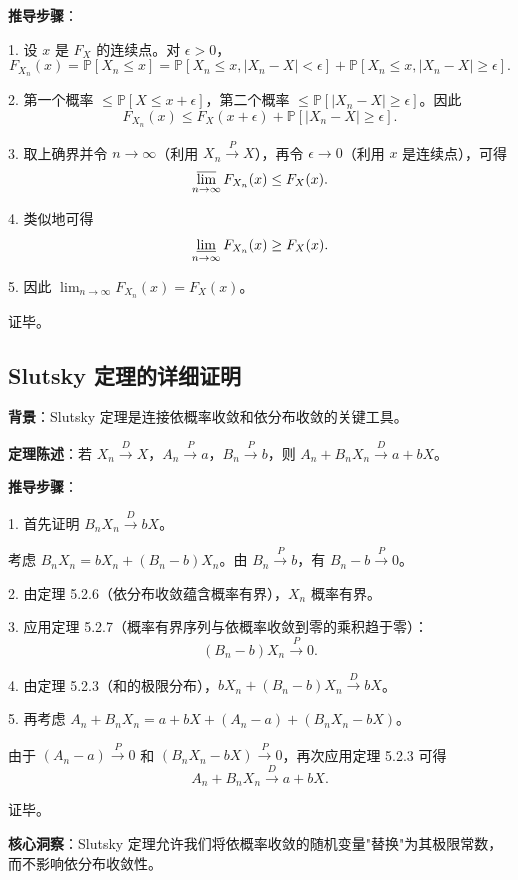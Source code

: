 \textbf{推导步骤}：

1. 设 $x$ 是 $F_X$ 的连续点。对 $\epsilon > 0$，
\[
F_{X_n}(x) = \mathbb{P}[X_n \leq x] = \mathbb{P}[X_n \leq x, |X_n - X| < \epsilon] + \mathbb{P}[X_n \leq x, |X_n - X| \geq \epsilon].
\]

2. 第一个概率 $\leq \mathbb{P}[X \leq x + \epsilon]$，第二个概率 $\leq \mathbb{P}[|X_n - X| \geq \epsilon]$。因此
\[
F_{X_n}(x) \leq F_X(x + \epsilon) + \mathbb{P}[|X_n - X| \geq \epsilon].
\]

3. 取上确界并令 $n \to \infty$（利用 $X_n \xrightarrow{P} X$），再令 $\epsilon \to 0$（利用 $x$ 是连续点），可得
\[
\varlimsup_{n \to \infty} F_{X_n}(x) \leq F_X(x).
\]

4. 类似地可得
\[
\varliminf_{n \to \infty} F_{X_n}(x) \geq F_X(x).
\]

5. 因此 $\lim_{n \to \infty} F_{X_n}(x) = F_X(x)$。

证毕。

\subsection{Slutsky 定理的详细证明}\label{sec:slutsky-proof}

\textbf{背景}：Slutsky 定理是连接依概率收敛和依分布收敛的关键工具。

\textbf{定理陈述}：若 $X_n \xrightarrow{D} X$，$A_n \xrightarrow{P} a$，$B_n \xrightarrow{P} b$，则 $A_n + B_n X_n \xrightarrow{D} a + bX$。

\textbf{推导步骤}：

1. 首先证明 $B_n X_n \xrightarrow{D} bX$。

考虑 $B_n X_n = bX_n + (B_n - b)X_n$。由 $B_n \xrightarrow{P} b$，有 $B_n - b \xrightarrow{P} 0$。

2. 由定理 5.2.6（依分布收敛蕴含概率有界），${X_n}$ 概率有界。

3. 应用定理 5.2.7（概率有界序列与依概率收敛到零的乘积趋于零）：
\[
(B_n - b)X_n \xrightarrow{P} 0.
\]

4. 由定理 5.2.3（和的极限分布），$bX_n + (B_n - b)X_n \xrightarrow{D} bX$。

5. 再考虑 $A_n + B_n X_n = a + bX + (A_n - a) + (B_n X_n - bX)$。

由于 $(A_n - a) \xrightarrow{P} 0$ 和 $(B_n X_n - bX) \xrightarrow{P} 0$，再次应用定理 5.2.3 可得
\[
A_n + B_n X_n \xrightarrow{D} a + bX.
\]

证毕。

\textbf{核心洞察}：Slutsky 定理允许我们将依概率收敛的随机变量"替换"为其极限常数，而不影响依分布收敛性。

